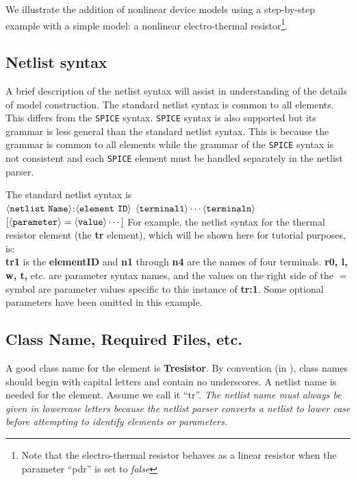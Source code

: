 We illustrate the addition of nonlinear device models using a
step-by-step example with a simple model: a nonlinear electro-thermal
resistor\footnote{Note that the electro-thermal resistor
behaves as a linear resistor when the parameter ``pdr'' is set to
\emph{false}}.

\subsection{Netlist syntax}
A brief description of the \FDA netlist syntax will assist in
understanding of the details of model construction.  The standard
\FDA netlist syntax is common to all elements. This differs from
the \texttt{SPICE} syntax.  \texttt{SPICE} syntax is also supported
but its grammar is less general than the standard \FDA netlist syntax.
This is because the \FDA grammar is common to all elements while the
grammar of the \texttt{SPICE} syntax is not consistent and
each \texttt{SPICE} element must be handled separately in the
netlist parser.

The standard \FDA netlist syntax is\\

$\langle \tt{netlist\ Name} \rangle$:$\langle \tt{element\
ID}\rangle$ $\langle \tt{terminal1}\rangle \cdots \langle
\tt{terminaln}\rangle$ $[\langle \tt{parameter} \rangle = \langle
\tt{value} \rangle \cdots]$
\newline
\newline
For example, the \FDA netlist syntax for the thermal resistor element
(the {\bf tr} element), which will be shown here for tutorial
purposes, is:
\newline
\newline
{} \\
\newline
{\bf tr1} is the {\bf elementID} and {\bf n1} through {\bf n4} are the
names of four terminals.  {\bf r0, l, w, t,} etc. are parameter syntax
names, and the values on the right side of the $=$ symbol are parameter
values specific to this instance of {\bf tr:1}.  Some optional parameters
have been omitted in this example.

\subsection{Class Name, Required Files, etc.}

A good class name for the element is \textbf{Tresistor}. By
convention (in \FDA), class names should begin with capital
letters and contain no underscores. A netlist name is needed for
the element. Assume we call it ``tr''.  \emph{The netlist name
must always be given in lowercase letters because the \FDA netlist
parser converts a netlist to lower case before attempting to
identify elements or parameters.}

